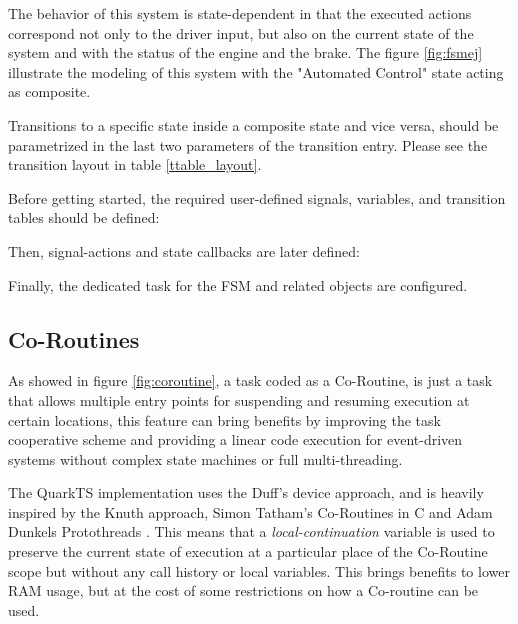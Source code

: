 

The behavior of this system is state-dependent in that the executed actions correspond not only to the driver input, but also on the current state of the system and with the status of the engine and the brake. 
The figure \ref{fig:fsmej} illustrate the modeling of this system with the "Automated Control" state acting as composite.
\medskip

\begin{tcolorbox}
\HandRight Transitions to a specific state inside a composite state and vice versa, should be parametrized in the last two parameters of the transition entry. Please see the transition layout in table \ref{ttable_layout}.
\end{tcolorbox}



Before getting started, the required user-defined signals, variables, and transition tables should be defined:



Then, signal-actions and state callbacks are later defined:



Finally, the dedicated task for the FSM and related objects are configured.



\subsection{Co-Routines}
As showed in figure \ref{fig:coroutine}, a task coded as a Co-Routine, is just a task that allows multiple entry points for suspending and resuming execution at certain locations, this feature can bring benefits by improving the task cooperative scheme and providing a linear code execution for event-driven systems without complex state machines or full multi-threading.
\medskip


    
The QuarkTS implementation uses the Duff's device approach, and is heavily inspired by the Knuth approach\cite{knuth}, Simon Tatham's Co-Routines in C \cite{tatham} and Adam Dunkels Protothreads \cite{dunkels}. This means that a \textit{local-continuation} variable is used to preserve the current state of execution at a particular place of the Co-Routine scope but without any call history or local variables. This brings benefits to lower RAM usage, but at the cost of some restrictions on how a Co-routine can be used.
\medskip

